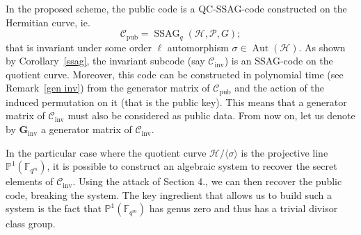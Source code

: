 \documentclass[10pt]{article}
\theoremstyle{definition}
\theoremstyle{definition}
\theoremstyle{definition}
\newcommand{\s}{\vspace{0.3cm}}
\newcommand{\C}{\mathcal{C}}
\newcommand{\PP}{\mathbb{P}}
\newcommand{\fqm}{\mathbb{F}_{q^m}}
\newcommand{\PR}{\mathcal{P}}
\newcommand{\Aut}{\operatorname{Aut}}
\newcommand{\ssag}{\operatorname{SSAG}}
\begin{document}
In the proposed scheme, the public code is a QC-SSAG-code constructed on the Hermitian curve, ie. 
\[\mathcal{C}_{\mathrm{pub}} = \ssag_q(\mathcal{H},\PR,G);\]
that is invariant under some order $\ell$ automorphism $\sigma \in \Aut(\mathcal{H})$. As shown by Corollary~\ref{ssag}, the invariant subcode (say $\mathcal{C}_{\mathrm{inv}}$) is an SSAG-code on the quotient curve. Moreover, this code can be constructed in polynomial time (see Remark~\ref{gen inv}) from the generator matrix of $\mathcal{C}_{\mathrm{pub}}$ and the action of the induced permutation on it (that is the public key). This means that a generator matrix of $\C_{\mathrm{inv}}$ must also be considered as public data. From now on, let us denote by $\mathbf{G}_{\mathrm{inv}}$ a generator matrix of $\mathcal{C}_{\mathrm{inv}}$.  

\s

In the particular case where the quotient curve $\mathcal{H}/\langle\sigma\rangle$ is the projective line $\PP^1(\fqm)$, it is possible to construct an algebraic system to recover the secret elements of $\C_{\mathrm{inv}}$. Using the attack of Section 4., we can then recover the public code, breaking the system. The key ingredient that allows us to build such a system is the fact that $\PP^1(\fqm)$ has genus zero and thus has a trivial divisor class group. 

\s
\end{document}
